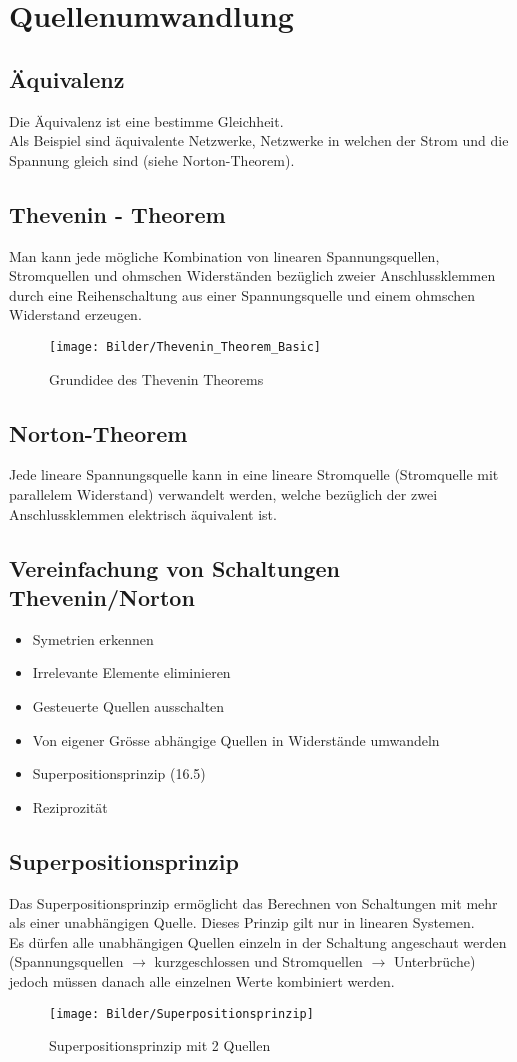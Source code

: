 \documentclass{article}
\begin{document}
\section{Quellenumwandlung}
\subsection{Äquivalenz}
Die Äquivalenz ist eine bestimme Gleichheit. \\
Als Beispiel sind äquivalente Netzwerke, Netzwerke in welchen der Strom und die Spannung gleich sind (siehe Norton-Theorem).
\subsection{Thevenin - Theorem}
	Man kann jede mögliche Kombination von linearen Spannungsquellen, Stromquellen und ohmschen Widerständen bezüglich zweier Anschlussklemmen durch eine Reihenschaltung aus einer Spannungsquelle und einem ohmschen Widerstand erzeugen. \\
	\begin{figure}[htbp]
		\centering
		\texttt{[image: Bilder/Thevenin\_Theorem\_Basic]}
		\caption{Grundidee des Thevenin Theorems}
	\end{figure}
\subsection{Norton-Theorem}
	Jede lineare Spannungsquelle kann in eine lineare Stromquelle (Stromquelle mit parallelem Widerstand) verwandelt werden, welche bezüglich der zwei Anschlussklemmen elektrisch äquivalent ist.
\subsection{Vereinfachung von Schaltungen Thevenin/Norton}
\begin{itemize}
	\item Symetrien erkennen 
	\item Irrelevante Elemente eliminieren
	\item Gesteuerte Quellen ausschalten
	\item Von eigener Grösse abhängige Quellen in Widerstände umwandeln
	\item Superpositionsprinzip (16.5) 
	\item Reziprozität 
\end{itemize}
\subsection{Superpositionsprinzip}
Das Superpositionsprinzip ermöglicht das Berechnen von Schaltungen mit mehr als einer unabhängigen Quelle. Dieses Prinzip gilt nur in linearen Systemen. \\
Es dürfen alle unabhängigen Quellen einzeln in der Schaltung angeschaut werden (Spannungsquellen $\rightarrow$ kurzgeschlossen und Stromquellen $\rightarrow$ Unterbrüche) jedoch müssen danach alle einzelnen Werte kombiniert werden.
\begin{figure}[htbp]
	\centering
	\texttt{[image: Bilder/Superpositionsprinzip]}
	\caption{Superpositionsprinzip mit 2 Quellen}
\end{figure}
\end{document}

